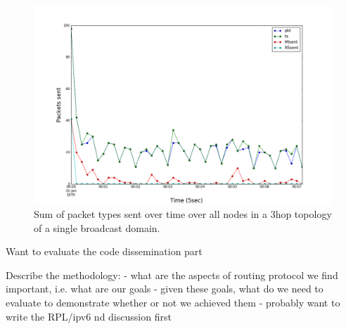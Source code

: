 \begin{figure}[t]
\centering
\includegraphics[width=\linewidth]{figs/3hop_single_hop.png}
\caption{Sum of packet types sent over time over all nodes in a 3hop topology of a single broadcast domain.}
\label{fig:3hop_single_hop}
\end{figure}

Want to evaluate the code dissemination part

Describe the methodology:
- what are the aspects of routing protocol we find important, i.e. what are our goals
- given these goals, what do we need to evaluate to demonstrate whether or not we achieved them
- probably want to write the RPL/ipv6 nd discussion first
\fi

